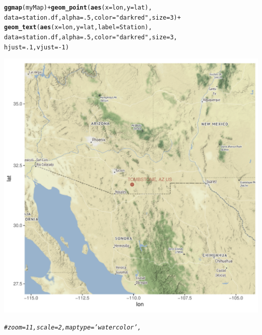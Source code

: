 \documentclass{article}\usepackage[]{graphicx}\usepackage[]{color}
\makeatletter
\def\maxwidth{ %
  \ifdim\Gin@nat@width>\linewidth
    \linewidth
  \else
    \Gin@nat@width
  \fi
}
\newcommand{\hlnum}[1]{\textcolor[rgb]{0.686,0.059,0.569}{#1}}%
\newcommand{\hlstr}[1]{\textcolor[rgb]{0.192,0.494,0.8}{#1}}%
\newcommand{\hlcom}[1]{\textcolor[rgb]{0.678,0.584,0.686}{\textit{#1}}}%
\newcommand{\hlopt}[1]{\textcolor[rgb]{0,0,0}{#1}}%
\newcommand{\hlstd}[1]{\textcolor[rgb]{0.345,0.345,0.345}{#1}}%
\newcommand{\hlkwc}[1]{\textcolor[rgb]{0.333,0.667,0.333}{#1}}%
\newcommand{\hlkwd}[1]{\textcolor[rgb]{0.737,0.353,0.396}{\textbf{#1}}}%
\newenvironment{kframe}{%
 \def\at@end@of@kframe{}%
 \ifinner\ifhmode%
  \def\at@end@of@kframe{\end{minipage}}%
  \begin{minipage}{\columnwidth}%
 \fi\fi%
 \def\FrameCommand##1{\hskip\@totalleftmargin \hskip-\fboxsep
 \colorbox{shadecolor}{##1}\hskip-\fboxsep
     \hskip-\linewidth \hskip-\@totalleftmargin \hskip\columnwidth}%
 \MakeFramed {\advance\hsize-\width
   \@totalleftmargin\z@ \linewidth\hsize
   \@setminipage}}%
 {\par\unskip\endMakeFramed%
 \at@end@of@kframe}
\newenvironment{knitrout}{}{} %
\makeatother
\begin{document}
\begin{knitrout}
\begin{kframe}
{\ttfamily\noindent\itshape\color{messagecolor}{\#\# Source : http://tile.stamen.com/terrain/7/26/53.png}}\begin{alltt}
\hlkwd{ggmap}\hlstd{(myMap)} \hlopt{+} \hlkwd{geom_point}\hlstd{(}\hlkwd{aes}\hlstd{(}\hlkwc{x} \hlstd{= lon,} \hlkwc{y} \hlstd{= lat),}
      \hlkwc{data} \hlstd{= station.df,} \hlkwc{alpha} \hlstd{=} \hlnum{.5}\hlstd{,} \hlkwc{color}\hlstd{=}\hlstr{"darkred"}\hlstd{,} \hlkwc{size} \hlstd{=} \hlnum{3}\hlstd{)} \hlopt{+}
      \hlkwd{geom_text}\hlstd{(}\hlkwd{aes}\hlstd{(}\hlkwc{x} \hlstd{= lon,} \hlkwc{y} \hlstd{= lat,} \hlkwc{label}\hlstd{=Station),}
      \hlkwc{data} \hlstd{= station.df,} \hlkwc{alpha} \hlstd{=} \hlnum{.5}\hlstd{,} \hlkwc{color}\hlstd{=}\hlstr{"darkred"}\hlstd{,} \hlkwc{size} \hlstd{=} \hlnum{3}\hlstd{,}
      \hlkwc{hjust}\hlstd{=}\hlnum{.1}\hlstd{,} \hlkwc{vjust}\hlstd{=}\hlopt{-}\hlnum{1}\hlstd{)}
\end{alltt}
\end{kframe}
\includegraphics[width=\maxwidth]{figure/unnamed-chunk-15-1} 
\begin{kframe}\begin{alltt}
\hlcom{#zoom = 11, scale = 2, maptype ='watercolor',}


\end{alltt}
\end{kframe}
\end{knitrout}
\end{document}
